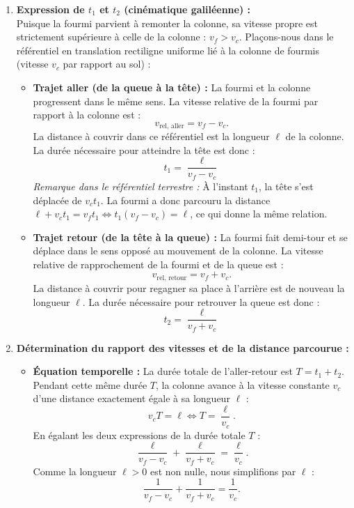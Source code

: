 \documentclass[11pt,a4paper]{article}
\begin{document}
\begin{correctionbox}
\begin{enumerate}
    \item \textbf{Expression de $t_1$ et $t_2$ (cinématique galiléenne) :}\\
    Puisque la fourmi parvient à remonter la colonne, sa vitesse propre est strictement supérieure à celle de la colonne : $v_f > v_c$.
    Plaçons-nous dans le référentiel en translation rectiligne uniforme lié à la colonne de fourmis (vitesse $v_c$ par rapport au sol) :
    \begin{itemize}[leftmargin=*,label=\textbullet]
        \item \textbf{Trajet aller (de la queue à la tête) :}
        La fourmi et la colonne progressent dans le même sens.
        La vitesse relative de la fourmi par rapport à la colonne est :
        \[
        v_{\text{rel, aller}} = v_f - v_c.
        \]
        La distance à couvrir dans ce référentiel est la longueur $\ell$ de la colonne.
        La durée nécessaire pour atteindre la tête est donc :
        \[
        \boxed{t_1 = \frac{\ell}{v_f - v_c}}
        \]
        \textit{Remarque dans le référentiel terrestre :} À l'instant $t_1$, la tête s'est déplacée de $v_c t_1$. La fourmi a donc parcouru la distance $\ell + v_c t_1 = v_f t_1 \iff t_1(v_f - v_c) = \ell$, ce qui donne la même relation.

        \item \textbf{Trajet retour (de la tête à la queue) :}
        La fourmi fait demi-tour et se déplace dans le sens opposé au mouvement de la colonne.
        La vitesse relative de rapprochement de la fourmi et de la queue est :
        \[
        v_{\text{rel, retour}} = v_f + v_c.
        \]
        La distance à couvrir pour regagner sa place à l'arrière est de nouveau la longueur $\ell$.
        La durée nécessaire pour retrouver la queue est donc :
        \[
        \boxed{t_2 = \frac{\ell}{v_f + v_c}}
        \]
    \end{itemize}

    \item \textbf{Détermination du rapport des vitesses et de la distance parcourue :}
    \begin{itemize}[leftmargin=*,label=\textbullet]
        \item \textbf{Équation temporelle :}
        La durée totale de l'aller-retour est $T = t_1 + t_2$.
        Pendant cette même durée $T$, la colonne avance à la vitesse constante $v_c$ d'une distance exactement égale à sa longueur $\ell$ :
        \[
        v_c T = \ell \iff T = \frac{\ell}{v_c}.
        \]
        En égalant les deux expressions de la durée totale $T$ :
        \[
        \frac{\ell}{v_f - v_c} + \frac{\ell}{v_f + v_c} = \frac{\ell}{v_c}.
        \]
        Comme la longueur $\ell > 0$ est non nulle, nous simplifions par $\ell$ :
        \[
        \frac{1}{v_f - v_c} + \frac{1}{v_f + v_c} = \frac{1}{v_c}.
        \]


\end{itemize}
\end{enumerate}
\end{correctionbox}
\end{document}
